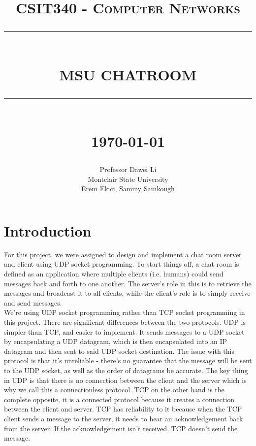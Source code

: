 \documentclass[12pt]{report}
\newcommand{\HRule}[1]{\rule{\linewidth}{#1}}
\begin{document}
\title{ \normalsize \textsc{CSIT340 - Computer Networks}
		\\ [0.5cm] \HRule{0.5pt} \\
		\LARGE \textbf{\uppercase{MSU Chatroom}}
		\HRule{0.5pt} \\ [0.5cm]
		\normalsize \today \vspace*{5\baselineskip}}

\date{}

\author{
        Professor Dawei Li \\
		Montclair State University \\
		Erem Ekici, Sammy Samkough }

\maketitle
\tableofcontents
\newpage

\sectionfont{\scshape}

\section{Introduction}
For this project, we were assigned to design and implement a chat room server and client using UDP socket programming. To start things off, a chat room is defined as an application where multiple clients (i.e. humans) could send messages back and forth to one another. The server's role in this is to retrieve the messages and broadcast it to all clients, while the client's role is to simply receive and send messages. \\

\noindent
We're using UDP socket programming rather than TCP socket programming in this project. There are significant differences between the two protocols. UDP is simpler than TCP, and easier to implement. It sends messages to a UDP socket by encapsulating a UDP datagram, which is then encapsulated into an IP datagram and then sent to said UDP socket destination. The issue with this protocol is that it's unreliable - there's no guarantee that the message will be sent to the UDP socket, as well as the order of datagrams be accurate. The key thing in UDP is that there is no connection between the client and the server which is why we call this a connectionless protocol. TCP on the other hand is the complete opposite, it is a connected protocol because it creates a connection between the client and server. TCP has reliability to it because when the TCP client sends a message to the server, it needs to hear an acknowledgement back from the server. If the acknowledgement isn't received, TCP doesn't send the message. \\
\end{document}
